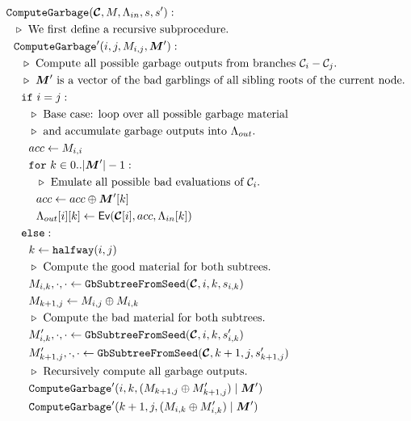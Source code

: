 \begin{figure}
  \begin{align*}
    &\computegarbage(\vec{\cir}, \mat, \Lambda_{in}, s, s'):\\
    &~~\codecomment{We first define a recursive subprocedure.}\\
    &~~\computegarbage'(i, j, \mat_{i,j}, \vec{\mat}'):\\
    &~~~~\codecomment{Compute all possible garbage outputs from
    branches $\cir_i-\cir_j$.}\\
    &~~~~\codecomment{$\vec{\mat}'$ is a vector of the bad garblings of
      all sibling roots of the current node.}\\
    &~~~~\cif~i = j:\\
    &~~~~~~\codecomment{Base case: loop over all possible garbage material}\\
    &~~~~~~\codecomment{and accumulate garbage outputs into
    $\Lambda_{out}$.}\\
    &~~~~~~acc \gets \mat_{i,i}\\
    &~~~~~~\cfor~k \in 0..|\vec{\mat}'|-1:\\
    &~~~~~~~~\codecomment{Emulate all possible bad evaluations of $\cir_i$.}\\
    &~~~~~~~~acc \gets acc \oplus \vec{\mat}'[k]\\
    &~~~~~~~~\Lambda_{out}[i][k] \gets \gEv(\vec{\cir}[i], acc, \Lambda_{in}[k])\\
    &~~~~\celse:\\
    &~~~~~~k \gets \halfway(i, j)\\
    &~~~~~~\codecomment{Compute the good material for both subtrees.}\\
    &~~~~~~\mat_{i, k}, \cdot, \cdot \gets \gbtree(\vec{\cir}, i, k, s_{i, k})\\
    &~~~~~~\mat_{k+1, j} \gets \mat_{i, j} \oplus \mat_{i, k}\\
    &~~~~~~\codecomment{Compute the bad material for both subtrees.}\\
    &~~~~~~\mat_{i, k}', \cdot, \cdot \gets \gbtree(\vec{\cir}, i, k, s'_{i, k})\\
    &~~~~~~\mat_{k+1, j}', \cdot, \cdot \gets \gbtree(\vec{\cir}, k+1, j, s'_{k+1, j})\\
    &~~~~~~\codecomment{Recursively compute all garbage outputs.}\\
    &~~~~~~\computegarbage'(i, k, (\mat_{k+1,j} \oplus \mat_{k+1,j}') \mid \vec{\mat}')\\
    &~~~~~~\computegarbage'(k+1, j, (\mat_{i,k} \oplus \mat_{i,k}') \mid \vec{\mat}')\\

\end{align*}
\end{figure}
